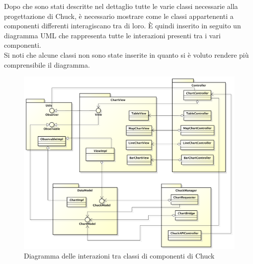 	Dopo che sono stati descritte nel dettaglio tutte le varie classi necessarie alla progettazione di Chuck, è necessario mostrare come le classi appartenenti a componenti differenti interagiscano tra di loro. È quindi inserito in seguito un diagramma UML che rappresenta tutte le interazioni presenti tra i vari componenti.\\
	Si noti che alcune classi non sono state inserite in quanto si è voluto rendere più comprensibile il diagramma.

	\begin{figure}[H]\centering
		\includegraphics[width=\textwidth]{SpecificaTecnica/Pics/InterazioniComponentiChuck.pdf}
		\caption{Diagramma delle interazioni tra classi di componenti di Chuck}
	\end{figure}